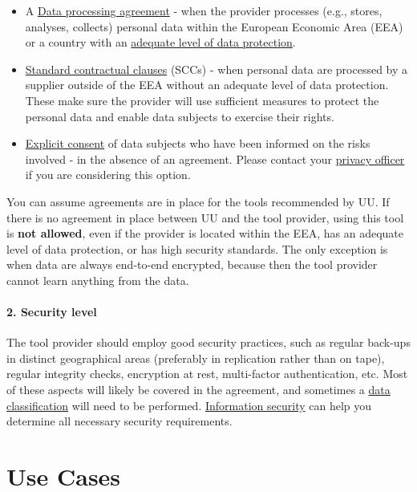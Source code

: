 \documentclass[
]{book}
\providecommand{\tightlist}{%
  \setlength{\itemsep}{0pt}\setlength{\parskip}{0pt}}
\begin{document}
\begin{itemize}
\tightlist
\item
  A \protect\hyperlink{data-processing-agreement}{Data processing agreement} -
  when the provider processes (e.g., stores, analyses, collects) personal data
  within the European Economic Area (EEA) or a country with an
  \href{https://ec.europa.eu/info/law/law-topic/data-protection/international-dimension-data-protection/adequacy-decisions_en}{adequate level of data protection}.
\item
  \protect\hyperlink{scc}{Standard contractual clauses} (SCCs) - when personal data are processed
  by a supplier outside of the EEA without an adequate level of data protection.
  These make sure the provider will use sufficient measures to protect the personal
  data and enable data subjects to exercise their rights.
\item
  \protect\hyperlink{informed-consent-forms}{Explicit consent} of data subjects who have been
  informed on the risks involved - in the absence of an agreement. Please contact your
  \protect\hyperlink{support}{privacy officer} if you are considering this option.
\end{itemize}

You can assume agreements are in place for the tools recommended by UU.
If there is no agreement in place between UU and the tool provider, using
this tool is \textbf{not allowed}, even if the provider is located within the EEA,
has an adequate level of data protection, or has high security standards. The
only exception is when data are always end-to-end encrypted, because then the
tool provider cannot learn anything from the data.

\hypertarget{security-level}{%
\subsection{2. Security level}\label{security-level}}

The tool provider should employ good security practices, such as regular back-ups
in distinct geographical areas (preferably in replication rather than on tape),
regular integrity checks, encryption at rest, multi-factor authentication, etc.
Most of these aspects will likely be covered in the agreement, and sometimes a
\protect\hyperlink{data-classification}{data classification} will need to be performed.
\protect\hyperlink{support}{Information security} can help you determine all necessary security requirements.

\hypertarget{part-use-cases}{%
\part*{Use Cases}\label{part-use-cases}}
\end{document}
